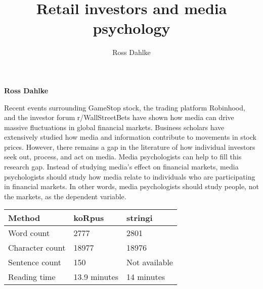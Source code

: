 \documentclass[12pt,]{article}
\title{Retail investors and media psychology  }
\author{\Large Ross Dahlke\vspace{0.05in} \newline\normalsize\emph{}  }
\date{}
\newcommand*{\authorfont}{\fontfamily{phv}\selectfont}
\renewenvironment{abstract}
 {{%
    \setlength{\leftmargin}{0mm}
    \setlength{\rightmargin}{\leftmargin}%
  }%
  \relax}
 {\endlist}
\begin{document}
	
%

{%
\setlength{\parindent}{0pt}
\thispagestyle{plain}
{\fontsize{18}{20}\selectfont\raggedright 
\maketitle  %

}

{
   \vskip 13.5pt\relax \normalsize\fontsize{11}{12} 
\textbf{\authorfont Ross Dahlke} \hskip 15pt \emph{\small }   

}

}








\begin{abstract}

    \hbox{\vrule height .2pt width 39.14pc}

    \vskip 8.5pt %

\noindent Recent events surrounding GameStop stock, the trading platform
Robinhood, and the investor forum r/WallStreetBets have shown how media
can drive massive fluctuations in global financial markets. Business
scholars have extensively studied how media and information contribute
to movements in stock prices. However, there remains a gap in the
literature of how individual investors seek out, process, and act on
media. Media psychologists can help to fill this research gap. Instead
of studying media's effect on financial markets, media psychologists
should study how media relate to individuals who are participating in
financial markets. In other words, media psychologists should study
people, not the markets, as the dependent variable.


    \hbox{\vrule height .2pt width 39.14pc}


\end{abstract}


\vskip -8.5pt



\noindent \doublespacing 

\begin{longtable}[]{@{}lll@{}}
\toprule
Method & koRpus & stringi\tabularnewline
\midrule
\endhead
Word count & 2777 & 2801\tabularnewline
Character count & 18977 & 18976\tabularnewline
Sentence count & 150 & Not available\tabularnewline
Reading time & 13.9 minutes & 14 minutes\tabularnewline
\bottomrule
\end{longtable}
\end{document}
